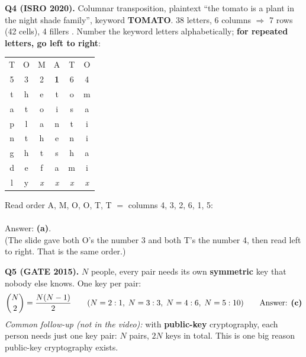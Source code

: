 \textbf{Q4 (ISRO 2020).} Columnar transposition, plaintext ``the tomato is a plant in the night shade family'', keyword \textbf{TOMATO}.
38 letters, 6 columns $\Rightarrow$ 7 rows (42 cells), 4 fillers . Number the keyword letters alphabetically; \textbf{for repeated letters, go left to right}:
\begin{center}\small
\begin{minipage}[c]{0.4\textwidth}\centering
\begin{tabular}{|*{6}{c|}}
\multicolumn{1}{c}{T}&\multicolumn{1}{c}{O}&\multicolumn{1}{c}{M}&\multicolumn{1}{c}{A}&\multicolumn{1}{c}{T}&\multicolumn{1}{c}{O}\\
\multicolumn{1}{c}{5}&\multicolumn{1}{c}{3}&\multicolumn{1}{c}{2}&\multicolumn{1}{c}{\textbf{1}}&\multicolumn{1}{c}{6}&\multicolumn{1}{c}{4}\\
\hline
t&h&e&\cellcolor{warn!18}t&o&m\\\hline
a&t&o&\cellcolor{warn!18}i&s&a\\\hline
p&l&a&\cellcolor{warn!18}n&t&i\\\hline
n&t&h&\cellcolor{warn!18}e&n&i\\\hline
g&h&t&\cellcolor{warn!18}s&h&a\\\hline
d&e&f&\cellcolor{warn!18}a&m&i\\\hline
l&y&\textit{x}&\cellcolor{warn!18}\textit{x}&\textit{x}&\textit{x}\\\hline
\end{tabular}
\end{minipage}
\begin{minipage}[c]{0.5\textwidth}
Read order A, M, O, O, T, T $=$ columns 4, 3, 2, 6, 1, 5:\\[3pt]
\\[3pt]
Answer: \textbf{(a)}.\\[2pt]
{\footnotesize (The slide gave both O's the number 3 and both T's the number 4, then read left to right. That is the same order.)}
\end{minipage}
\end{center}

\textbf{Q5 (GATE 2015).} $N$ people, every pair needs its own \textbf{symmetric} key that nobody else knows. One key per pair:
\[
\binom{N}{2} = \frac{N(N-1)}{2} \qquad (N=2: 1,\; N=3: 3,\; N=4: 6,\; N=5: 10) \qquad\text{Answer: \textbf{(c)}}
\]
{\small\emph{Common follow-up (not in the video):} with \textbf{public-key} cryptography, each person needs just one key pair: $N$ pairs, $2N$ keys in total. This is one big reason public-key cryptography exists.}

